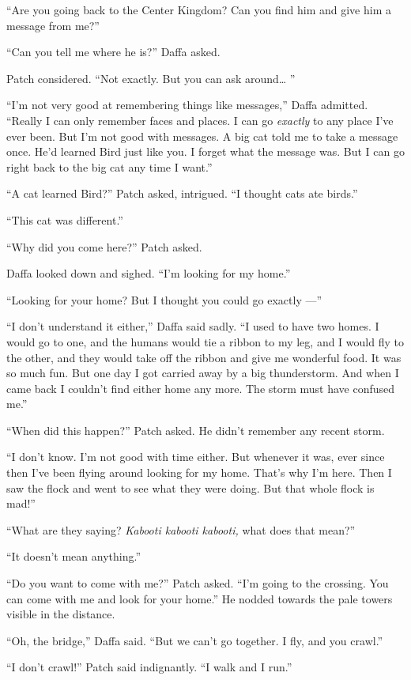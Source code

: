 \documentclass[12pt]{memoir}
\begin{document}
“Are you going back to the Center Kingdom? Can you find him and give
him a message from me?”

“Can you tell me where he is?” Daffa asked.

Patch considered. “Not exactly. But you can ask around… ”

“I’m not very good at remembering things like messages,” Daffa
admitted. “Really I can only remember faces and places. I can go
\textit{exactly} to any place I’ve ever been. But I’m not good with
messages. A big cat told me to take a message once. He’d learned Bird
just like you. I forget what the message was. But I can go right back
to the big cat any time I want.”

“A cat learned Bird?” Patch asked, intrigued. “I thought cats ate
birds.”

“This cat was different.”

“Why did you come here?” Patch asked.

Daffa looked down and sighed. “I’m looking for my home.”

“Looking for your home? But I thought you could go exactly —”

“I don’t understand it either,” Daffa said sadly. “I used to have two
homes. I would go to one, and the humans would tie a ribbon to my leg,
and I would fly to the other, and they would take off the ribbon and
give me wonderful food. It was so much fun. But one day I got carried
away by a big thunderstorm. And when I came back I couldn’t find
either home any more. The storm must have confused me.”

“When did this happen?” Patch asked. He didn’t remember any recent
storm.

“I don’t know. I’m not good with time either. But whenever it was,
ever since then I’ve been flying around looking for my home. That’s
why I’m here. Then I saw the flock and went to see what they were
doing. But that whole flock is mad!”

“What are they saying? \textit{Kabooti kabooti kabooti,} what does
that mean?”

“It doesn’t mean anything.”

“Do you want to come with me?” Patch asked. “I’m going to the
crossing. You can come with me and look for your home.” He nodded
towards the pale towers visible in the distance.

“Oh, the bridge,” Daffa said. “But we can’t go together. I fly, and
you crawl.”

“I don’t crawl!” Patch said indignantly. “I walk and I run.”
\end{document}
